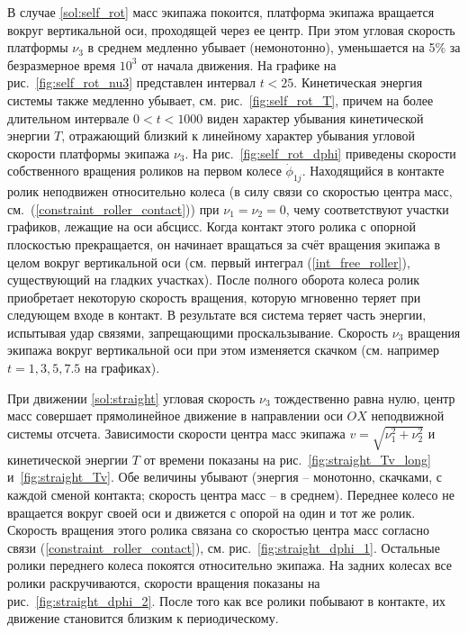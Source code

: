 В случае \ref{sol:self_rot} масс экипажа покоится, платформа экипажа вращается вокруг вертикальной оси, проходящей через ее центр. При этом угловая скорость платформы $\nu_3$ в среднем медленно убывает (немонотонно), уменьшается на 5\%  за безразмерное время $10^3$ от начала движения. На графике на рис.~\ref{fig:self_rot_nu3} представлен интервал $t < 25$.  Кинетическая энергия системы также медленно убывает, см. рис.~\ref{fig:self_rot_T}, причем на более длительном интервале $0 < t < 1000$ виден характер убывания кинетической энергии $T$, отражающий близкий к линейному характер убывания угловой скорости платформы экипажа $\nu_3$. На рис.~\ref{fig:self_rot_dphi} приведены скорости собственного вращения роликов на первом колесе $\dot{\phi}_{1j}$. Находящийся в контакте ролик неподвижен относительно колеса (в силу связи со скоростью центра масс, см.~(\ref{constraint_roller_contact})) при $\nu_1 = \nu_2 = 0$, чему соответствуют участки графиков, лежащие на оси абсцисс. Когда контакт этого ролика с опорной плоскостью прекращается, он начинает вращаться за счёт вращения экипажа в целом вокруг вертикальной оси (см. первый интеграл (\ref{int_free_roller}), существующий на гладких участках). После полного оборота колеса ролик приобретает некоторую скорость вращения, которую мгновенно теряет при следующем входе в контакт. В результате вся система теряет часть энергии, испытывая удар связями, запрещающими проскальзывание. Скорость $\nu_3$ вращения экипажа вокруг вертикальной оси при этом изменяется скачком (см. например $t=1, 3, 5, 7.5$ на графиках).

При движении \ref{sol:straight} угловая скорость $\nu_3$ тождественно равна нулю, центр масс совершает прямолинейное движение в направлении оси $OX$ неподвижной системы отсчета. Зависимости скорости центра масс экипажа $v = \sqrt{\nu_1^2+\nu_2^2}$ и кинетической энергии $T$ от времени показаны на рис.~\ref{fig:straight_Tv_long} и~\ref{fig:straight_Tv}. Обе величины убывают (энергия -- монотонно, скачками, с каждой сменой контакта; скорость центра масс -- в среднем). Переднее колесо не вращается вокруг своей оси и движется с опорой на один и тот же ролик. Скорость вращения этого ролика связана со скоростью центра масс согласно связи (\ref{constraint_roller_contact}), см. рис.~\ref{fig:straight_dphi_1}. Остальные ролики переднего колеса покоятся относительно экипажа. На задних колесах все ролики раскручиваются, скорости вращения показаны на рис.~\ref{fig:straight_dphi_2}. После того как все ролики побывают в контакте, их движение становится близким к периодическому.

